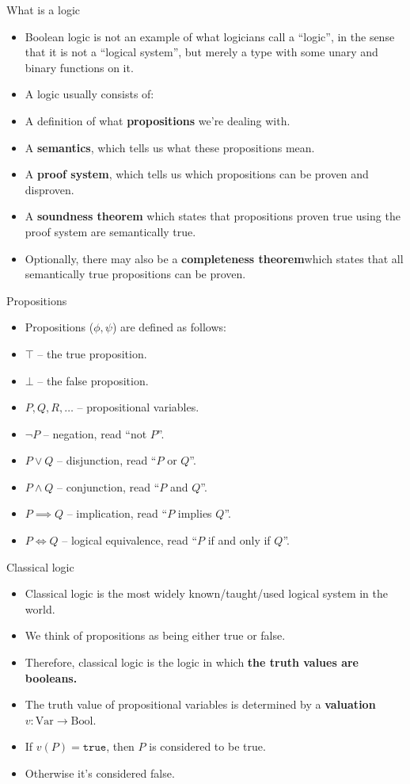\documentclass{beamer}
\newcommand{\m}[1]{\texttt{#1}}
\newcommand{\true}{\m{true}}
\begin{document}
\begin{frame}{What is a logic}
\begin{itemize}
	\item Boolean logic is not an example of what logicians call a ``logic'', in the sense that it is not a ``logical system'', but merely a type with some unary and binary functions on it.
	\item A logic usually consists of:
	\item A definition of what \textbf{propositions} we're dealing with.
	\item A \textbf{semantics}, which tells us what these propositions mean.
	\item A \textbf{proof system}, which tells us which propositions can be proven and disproven.
	\item A \textbf{soundness theorem} which states that propositions proven true using the proof system are semantically true.
	\item Optionally, there may also be a \textbf{completeness theorem}which states that all semantically true propositions can be proven.
\end{itemize}
\end{frame}

\begin{frame}{Propositions}
\begin{itemize}
	\item Propositions ($\phi, \psi$) are defined as follows:
	\item $\top$ -- the true proposition.
	\item $\bot$ -- the false proposition.
	\item $P, Q, R, \dots$ -- propositional variables.
	\item $\neg P$ -- negation, read ``not $P$''.
	\item $P \lor Q$ -- disjunction, read ``$P$ or $Q$''.
	\item $P \land Q$ -- conjunction, read ``$P$ and $Q$''.
	\item $P \implies Q$ -- implication, read ``$P$ implies $Q$''.
	\item $P \iff Q$ -- logical equivalence, read ``$P$ if and only if $Q$''.
\end{itemize}
\end{frame}

\begin{frame}{Classical logic}
\begin{itemize}
	\item Classical logic is the most widely known/taught/used logical system in the world.
	\item We think of propositions as being either true or false.
	\item Therefore, classical logic is the logic in which \textbf{the truth values are booleans.}
	\item The truth value of propositional variables is determined by a \textbf{valuation} $v : \text{Var} \to \text{Bool}$.
	\item If $v(P) = \true$, then $P$ is considered to be true.
	\item Otherwise it's considered false.
\end{itemize}
\end{frame}
\end{document}
